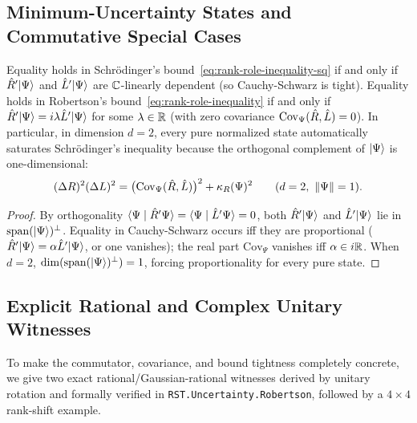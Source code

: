 \subsection{Minimum-Uncertainty States and Commutative Special Cases}
\label{subsec:unc-tightness}

\begin{proposition}
\label{prop:minimum-uncertainty}
Equality holds in Schr\"odinger's bound~\eqref{eq:rank-role-inequality-sq} if and only if
$\hat{R}'\lvert \Psi \rangle$ and $\hat{L}'\lvert \Psi \rangle$ are $\mathbb{C}$-linearly dependent (so Cauchy-Schwarz is
tight). Equality holds in Robertson's bound~\eqref{eq:rank-role-inequality} if and only if
$\hat{R}'\lvert \Psi \rangle = i\lambda \hat{L}'\lvert \Psi \rangle$ for some $\lambda \in \mathbb{R}$ (with zero
covariance $\mathrm{Cov}_\Psi(\hat{R},\hat{L}) = 0$). In particular, in dimension $d = 2$, every
pure normalized state automatically saturates Schr\"odinger's inequality because the
orthogonal complement of $\lvert \Psi \rangle$ is one-dimensional:
\begin{equation}
  (\Delta R)^2 (\Delta L)^2 = \bigl(\mathrm{Cov}_\Psi(\hat{R},\hat{L})\bigr)^2 + \kappa_R(\Psi)^2
  \qquad (d = 2,\ \lVert \Psi \rVert = 1).
  \label{eq:min-unc-eq}
\end{equation}
\end{proposition}
\begin{proof}
By orthogonality $\langle \Psi \mid \hat{R}'\Psi \rangle = \langle \Psi \mid \hat{L}'\Psi \rangle = 0$, both $\hat{R}'\lvert \Psi \rangle$
and $\hat{L}'\lvert \Psi \rangle$ lie in $\mathrm{span}(\lvert \Psi \rangle)^\perp$. Equality in Cauchy-Schwarz
occurs iff they are proportional ($\hat{R}'\lvert \Psi \rangle = \alpha\hat{L}'\lvert \Psi \rangle$, or one vanishes);
the real part $\mathrm{Cov}_\Psi$ vanishes iff $\alpha \in i\mathbb{R}$. When $d = 2$,
$\dim(\mathrm{span}(\lvert \Psi \rangle)^\perp) = 1$, forcing proportionality for every pure state.
\end{proof}

\subsection{Explicit Rational and Complex Unitary Witnesses}
\label{subsec:unc-worked}

To make the commutator, covariance, and bound tightness completely concrete, we give
two exact rational/Gaussian-rational witnesses derived by unitary rotation and formally
verified in \texttt{RST.Uncertainty.Robertson}, followed by a $4\times 4$ rank-shift example.

